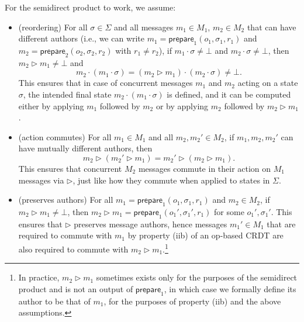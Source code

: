 \documentclass[acmsmall,nonacm]{acmart}
\newcommand{\msf}[1]{\ensuremath{\mathsf{#1}}}
\newcommand{\act}{\triangleright}
\theoremstyle{plain}
\theoremstyle{definition}
\begin{document}
For the semidirect product to work, we assume:
\begin{itemize}
  \item (reordering) For all $\sigma \in \Sigma$ and all messages $m_1 \in M_1$, $m_2 \in M_2$ that can have different authors (i.e., we can write $m_1 = \msf{prepare}_1(o_1, \sigma_1, r_1)$ and $m_2 = \msf{prepare}_2(o_2, \sigma_2, r_2)$ with $r_1 \neq r_2$), if $m_1 \cdot \sigma \neq \bot$ and $m_2 \cdot \sigma \neq \bot$, then $m_2 \act m_1 \neq \bot$ and
  \[
  m_2 \cdot (m_1 \cdot \sigma) = (m_2 \act m_1) \cdot (m_2 \cdot \sigma) \neq \bot.
  \]
  This ensures that in case of concurrent messages $m_1$ and $m_2$ acting on a state $\sigma$, the intended final state $m_2 \cdot (m_1 \cdot \sigma)$ is defined, and it can be computed either by applying $m_1$ followed by $m_2$ or by applying $m_2$ followed by $m_2 \act m_1$.
  \item (action commutes) For all $m_1 \in M_1$ and all $m_2, m_2' \in M_2$, if $m_1, m_2, m_2'$ can have mutually different authors, then
  \[
  m_2 \act (m_2' \act m_1) = m_2' \act (m_2 \act m_1).
  \]
  This ensures that concurrent $M_2$ messages commute in their action on $M_1$ messages via $\act$, just like how they commute when applied to states in $\Sigma$.
  \item (preserves authors) For all $m_1 = \msf{prepare}_1(o_1, \sigma_1, r_1)$ and $m_2 \in M_2$, if $m_2 \act m_1 \neq \bot$, then $m_2 \act m_1 = \msf{prepare}_1( o_1', \sigma_1', r_1)$ for some $o_1', \sigma_1'$.  This ensures that $\act$ preserves message authors, hence messages $m_1' \in M_1$ that are required to commute with $m_1$ by property (iib) of an op-based CRDT are also required to commute with $m_2 \act m_1$.\footnote{In practice, $m_2 \act m_1$ sometimes exists only for the purposes of the semidirect product and is not an output of $\msf{prepare}_1$, in which case we formally define its author to be that of $m_1$, for the purposes of property (iib) and the above assumptions.}
\end{itemize}
\end{document}
